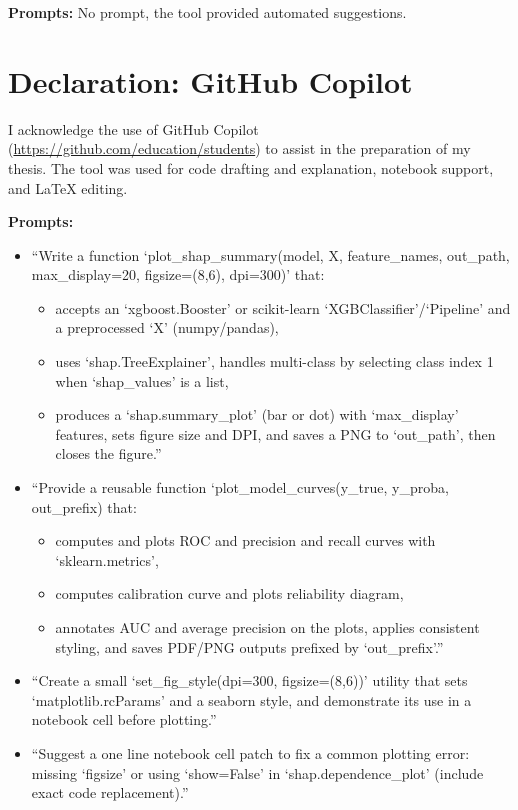 \textbf{Prompts:}
No prompt, the tool provided automated suggestions.

\section*{Declaration: GitHub Copilot}
I acknowledge the use of GitHub Copilot (\url{https://github.com/education/students}) to assist in the preparation of my thesis. The tool was used for code drafting and explanation, notebook support, and LaTeX editing.

\textbf{Prompts:}
\begin{itemize}
    \item[-] ``Write a function `plot\_shap\_summary(model, X, feature\_names, out\_path, max\_display=20, figsize=(8,6), dpi=300)' that:
    \begin{itemize}
        \item accepts an `xgboost.Booster' or scikit-learn `XGBClassifier'/`Pipeline' and a preprocessed `X' (numpy/pandas),
        \item uses `shap.TreeExplainer', handles multi-class by selecting class index 1 when `shap\_values' is a list,\
        \item produces a `shap.summary\_plot' (bar or dot) with `max\_display' features, sets figure size and DPI, and saves a PNG to `out\_path', then closes the figure.''
    \end{itemize}
    \item[-] ``Provide a reusable function `plot\_model\_curves(y\_true, y\_proba, out\_prefix) that:
    \begin{itemize}
        \item computes and plots ROC and precision and recall curves with `sklearn.metrics',
        \item computes calibration curve and plots reliability diagram,\
        \item annotates AUC and average precision on the plots, applies consistent styling, and saves PDF/PNG outputs prefixed by `out\_prefix'.''
    \end{itemize}
    \item[-] ``Create a small `set\_fig\_style(dpi=300, figsize=(8,6))' utility that sets `matplotlib.rcParams' and a seaborn style, and demonstrate its use in a notebook cell before plotting.''
    \item[-] ``Suggest a one line notebook cell patch to fix a common plotting error: missing `figsize' or using `show=False' in `shap.dependence\_plot' (include exact code replacement).''
\end{itemize}


